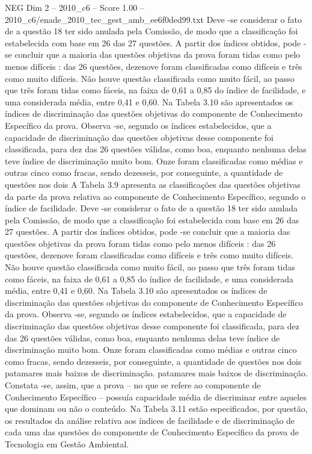 \begin{textsample}{NEG Dim 2 – 2010\_c6 – Score 1.00 – 2010\_c6/enade\_2010\_tec\_gest\_amb\_ee6f0ded99.txt}
Deve -se considerar o fato de a questão 18 ter sido anulada pela Comissão, de modo que a classificação foi estabelecida com base em 26 das 27 questões.
A partir dos índices obtidos, pode -se concluir que a maioria das questões objetivas da prova foram tidas como pelo menos difíceis : das 26 questões, dezenove foram classificadas como difíceis e três como muito difíceis.
Não houve questão classificada como muito fácil, ao passo que três foram tidas como fáceis, na faixa de 0,61 a 0,85 do índice de facilidade, e uma considerada média, entre 0,41 e 0,60.
Na Tabela 3.10 são apresentados os índices de discriminação das questões objetivas do componente de Conhecimento Específico da prova.
Observa -se, segundo os índices estabelecidos, que a capacidade de discriminação das questões objetivas desse componente foi classificada, para dez das 26 questões válidas, como boa, enquanto nenhuma delas teve índice de discriminação muito bom.
Onze foram classificadas como médias e outras cinco como fracas, sendo dezesseis, por conseguinte, a quantidade de questões nos dois A Tabela 3.9 apresenta as classificações das questões objetivas da parte da prova relativa ao componente de Conhecimento Específico, segundo o índice de facilidade.
Deve -se considerar o fato de a questão 18 ter sido anulada pela Comissão, de modo que a classificação foi estabelecida com base em 26 das 27 questões.
A partir dos índices obtidos, pode -se concluir que a maioria das questões objetivas da prova foram tidas como pelo menos difíceis : das 26 questões, dezenove foram classificadas como difíceis e três como muito difíceis.
Não houve questão classificada como muito fácil, ao passo que três foram tidas como fáceis, na faixa de 0,61 a 0,85 do índice de facilidade, e uma considerada média, entre 0,41 e 0,60.
Na Tabela 3.10 são apresentados os índices de discriminação das questões objetivas do componente de Conhecimento Específico da prova.
Observa -se, segundo os índices estabelecidos, que a capacidade de discriminação das questões objetivas desse componente foi classificada, para dez das 26 questões válidas, como boa, enquanto nenhuma delas teve índice de discriminação muito bom.
Onze foram classificadas como médias e outras cinco como fracas, sendo dezesseis, por conseguinte, a quantidade de questões nos dois patamares mais baixos de discriminação. patamares mais baixos de discriminação.
Constata -se, assim, que a prova – no que se refere ao componente de Conhecimento Específico – possuía capacidade média de discriminar entre aqueles que dominam ou não o conteúdo.
Na Tabela 3.11 estão especificados, por questão, os resultados da análise relativa aos índices de facilidade e de discriminação de cada uma das questões do componente de Conhecimento Específico da prova de Tecnologia em Gestão Ambiental.

\end{textsample}
